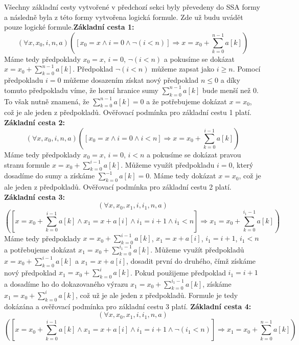 \documentclass{article}
\begin{document}
Všechny základní cesty vytvořené v předchozí sekci byly převedeny do SSA formy a následně byla z této formy vytvořena logická formule. Zde už budu uvádět pouze logické formule.\newline\newline \textbf{Základní cesta 1:} 
$$(\forall x, x_0, i, n, a)([x_0 = x \wedge i = 0 \wedge \neg(i < n)] \Rightarrow x = x_0 + \sum_{k=0}^{n-1} a[k])$$ 
Máme tedy předpoklady $x_0 = x$, $i = 0$, $\neg(i < n)$ a pokusíme se dokázat $x = x_0 + \sum_{k=0}^{n-1} a[k]$. Předpoklad $\neg(i < n)$ můžeme zapsat jako $i \geq n$. Pomocí předpokladu $i = 0$ můžeme dosazením získat nový předpoklad $n \leq 0$ a díky tomuto předpokladu víme, že horní hranice sumy $\sum_{k=0}^{n-1} a[k]$ bude menší než 0. To však nutně znamená, že $\sum_{k=0}^{n-1} a[k] = 0$ a že potřebujeme dokázat $x = x_0$, což je ale jeden z předpokladů. Ověřovací podmínka pro základní cestu 1 platí.
\newline\newline \textbf{Základní cesta 2:} $$(\forall x, x_0, i, n, a)([x_0 = x \wedge i = 0 \wedge i < n] \Rightarrow x = x_0 + \sum_{k=0}^{i-1} a[k])$$
Máme tedy předpoklady $x_0 = x$, $i = 0$, $i < n$ a pokusíme se dokázat pravou stranu formule $x = x_0 + \sum_{k=0}^{i-1} a[k]$. Můžeme využít předpokladu $i = 0$, který dosadíme do sumy a získáme $\sum_{k=0}^{-1} a[k] = 0$. Máme tedy dokázat $x = x_0$, což je ale jeden z předpokladů. Ověřovací podmínka pro základní cestu 2 platí.
\newline\newline \textbf{Základní cesta 3:} $$(\forall x, x_0, x_1, i, i_1, n, a)$$  $$([ x = x_0 + \sum_{k=0}^{i-1} a[k] \wedge x_1 = x + a[i] \wedge i_1 =  i + 1 \wedge i_1 < n]\Rightarrow x_1 = x_0 + \sum_{k=0}^{i_1 - 1} a[k])$$
Máme tedy předpoklady $x = x_0 + \sum_{k=0}^{i-1} a[k]$, $x_1 = x + a[i]$, $i_1 =  i + 1$, $i_1 < n$ a potřebujeme dokázat $x_1 = x_0 + \sum_{k=0}^{i_1 - 1} a[k]$. Můžeme využít předpokladů $x = x_0 + \sum_{k=0}^{i-1} a[k]$ a $x_1 = x + a[i]$, dosadit první do druhého, čímž získáme nový předpoklad $x_1 = x_0 + \sum_{k=0}^{i} a[k]$. Pokud použijeme předpoklad $i_1 = i + 1$ a dosadíme ho do dokazovaného výrazu $x_1 = x_0 + \sum_{k=0}^{i_1 - 1} a[k]$, získáme $x_1 = x_0 + \sum_{k=0}^{i} a[k]$, což už je ale jeden z předpokladů. Formule je tedy dokázána a ověřovací podmínka pro základní cestu 3 platí.
\newline\newline \textbf{Základní cesta 4:} \newpage $$(\forall x, x_0, x_1, i, i_1, n, a)$$  $$([ x = x_0 + \sum_{k=0}^{i-1} a[k] \wedge x_1 = x + a[i] \wedge i_1 =  i + 1 \wedge \neg (i_1 < n)]\Rightarrow x_1 = x_0 + \sum_{k=0}^{n - 1} a[k])$$ 
\end{document}
